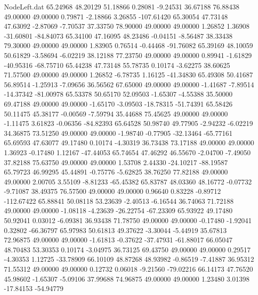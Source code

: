 \begin{filecontents}{NodeLeft.dat}
  65.24968   48.20129   51.18866     0.28081   -9.24531   36.67188   76.88438   49.00000   49.00000    0.79871   -2.18866    3.26855 -107.61420
  65.30054   47.73148   47.63092    -2.87069   -7.70537   37.33750   78.90000   49.00000   49.00000    1.26852    1.36908  -31.60801  -84.84073
  65.34100   47.16095   48.23486    -0.04151   -8.56487   38.33438   79.30000   49.00000   49.00000    1.83905    0.76514   -0.44468  -91.76082
  65.39169   48.10059   50.61829    -3.58694   -6.02219   38.12188   77.23750   49.00000   49.00000    0.89941   -1.61829  -40.95316  -68.75710
  65.44238   47.73148   55.78735     0.10174   -3.62275   38.60625   71.57500   49.00000   49.00000    1.26852   -6.78735    1.16125  -41.34830
  65.49308   50.41687   56.89514    -1.25913   -7.09656   36.56562   67.65000   49.00000   49.00000   -1.41687   -7.89514  -14.37342  -81.00978
  65.53378   50.65170   52.09503    -1.65307   -4.55388   35.50000   69.47188   49.00000   49.00000   -1.65170   -3.09503  -18.78315  -51.74391
  65.58426   50.11475   45.38177    -0.00569   -7.59794   35.44688   75.45625   49.00000   49.00000   -1.11475    3.61823   -0.06356  -84.82393
  65.64528   50.98740   49.77905    -2.94232   -6.02219   34.36875   73.51250   49.00000   49.00000   -1.98740   -0.77905  -32.13464  -65.77161
  65.69593   47.63077   49.17480     0.10174   -4.30319   36.73438   73.17188   49.00000   49.00000    1.36923   -0.17480    1.12167  -47.44053
  65.74654   47.46292   46.55670    -2.04700   -7.49050   37.82188   75.63750   49.00000   49.00000    1.53708    2.44330  -24.10217  -88.19587
  65.79723   46.99295   45.44891    -0.75776   -5.62825   38.76250   77.82188   49.00000   49.00000    2.00705    3.55109   -8.81233  -65.45382
  65.83787   48.03360   48.16772    -0.07732   -9.71087   38.49375   76.57500   49.00000   49.00000    0.96640    0.83228   -0.89712 -112.67422
  65.88841   50.08118   53.23639    -2.40513   -6.16544   36.74063   71.72188   49.00000   49.00000   -1.08118   -4.23639  -26.22754  -67.23309
  65.93922   49.17480   50.92041     0.03012   -6.09381   36.93438   71.78750   49.00000   49.00000   -0.17480   -1.92041    0.32802  -66.36797
  65.97983   50.61813   49.37622    -3.30044   -5.44919   35.67813   72.96875   49.00000   49.00000   -1.61813   -0.37622  -37.47931  -61.88017
  66.05047   48.70483   53.30353     0.10174   -3.04975   36.73125   69.43750   49.00000   49.00000    0.29517   -4.30353    1.12725  -33.78909
  66.10109   48.87268   48.93982    -0.86519   -7.41887   36.95312   71.55312   49.00000   49.00000    0.12732    0.06018   -9.21560  -79.02216
  66.14173   47.76520   45.98602    -1.65307   -5.09106   37.99688   74.96875   49.00000   49.00000    1.23480    3.01398  -17.84153  -54.94779

\end{filecontents}
